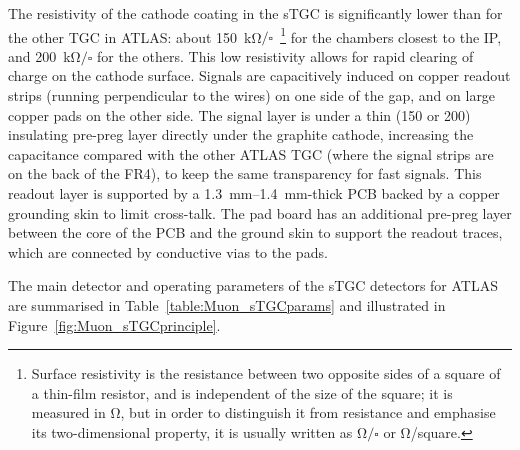 \documentclass[cernpreprint, atlasdraft=false, UKenglish,british,orcidlogo, texmf, orcidlogo]{atlasdoc}
\begin{document}
The resistivity of the cathode coating in the \gls{sTGC} is significantly lower than for the other \gls{TGC} in ATLAS: about \SI{150}{\kilo\ohm}$/\square$~\footnote{Surface resistivity is the resistance between two opposite sides of a square of a thin-film resistor, and is independent of the size of the square; it is measured in \si{\ohm}, but in order to distinguish it from resistance and emphasise its two-dimensional property, it is usually written as $\si{\ohm}/\square$ or \si{\ohm/square}.} 
for the chambers closest to the \gls{IP}, and \SI{200}{\kilo\ohm}$/\square$ for the others.
This low resistivity allows for rapid clearing of charge on the cathode surface.
Signals are capacitively induced on copper readout strips (running perpendicular to the wires) on one side of the gap, and on large copper pads on the other side. The signal layer is under a thin (\num{150} or \SI{200}{\micron}) insulating pre-preg layer directly under the graphite cathode, increasing the capacitance compared with the other ATLAS \gls{TGC} (where the signal strips are on the back of the \gls{FR4}), to keep the same transparency for fast signals.
This readout layer is supported by a \SIrange{1.3}{1.4}{\mm}-thick \gls{PCB} backed by a copper grounding skin to limit cross-talk. The pad board has an additional pre-preg layer between the core of the \gls{PCB} and the ground skin to support the readout traces, which are connected by conductive vias to the pads.
 
The main detector and operating parameters of the \gls{sTGC} detectors for ATLAS are summarised in Table~\ref{table:Muon_sTGCparams} and illustrated in Figure~\ref{fig:Muon_sTGCprinciple}.
 
\end{document}
